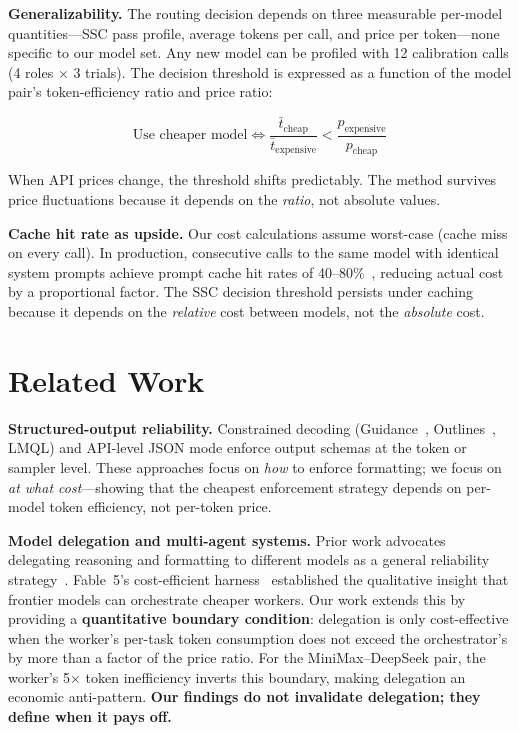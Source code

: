 \documentclass[11pt,a4paper]{article}
\begin{document}
\textbf{Generalizability.} The routing decision depends on three measurable per-model quantities---SSC pass profile, average tokens per call, and price per token---none specific to our model set. Any new model can be profiled with 12 calibration calls (4 roles $\times$ 3 trials). The decision threshold is expressed as a function of the model pair's token-efficiency ratio and price ratio:

\[\text{Use cheaper model} \iff \frac{\bar{t}_{\text{cheap}}}{\bar{t}_{\text{expensive}}} < \frac{p_{\text{expensive}}}{p_{\text{cheap}}}\]

When API prices change, the threshold shifts predictably. The method survives price fluctuations because it depends on the \textit{ratio}, not absolute values.

\textbf{Cache hit rate as upside.} Our cost calculations assume worst-case (cache miss on every call). In production, consecutive calls to the same model with identical system prompts achieve prompt cache hit rates of 40--80\%~\cite{fable5harness}, reducing actual cost by a proportional factor. The SSC decision threshold persists under caching because it depends on the \textit{relative} cost between models, not the \textit{absolute} cost.

\section{Related Work}

\textbf{Structured-output reliability.} Constrained decoding (Guidance~\cite{guidance}, Outlines~\cite{willard2023}, LMQL) and API-level JSON mode enforce output schemas at the token or sampler level. These approaches focus on \textit{how} to enforce formatting; we focus on \textit{at what cost}---showing that the cheapest enforcement strategy depends on per-model token efficiency, not per-token price.

\textbf{Model delegation and multi-agent systems.} Prior work advocates delegating reasoning and formatting to different models as a general reliability strategy~\cite{chen2026empirical}. Fable~5's cost-efficient harness~\cite{fable5harness} established the qualitative insight that frontier models can orchestrate cheaper workers. Our work extends this by providing a \textbf{quantitative boundary condition}: delegation is only cost-effective when the worker's per-task token consumption does not exceed the orchestrator's by more than a factor of the price ratio. For the MiniMax--DeepSeek pair, the worker's 5$\times$ token inefficiency inverts this boundary, making delegation an economic anti-pattern. \textbf{Our findings do not invalidate delegation; they define when it pays off.}
\end{document}

